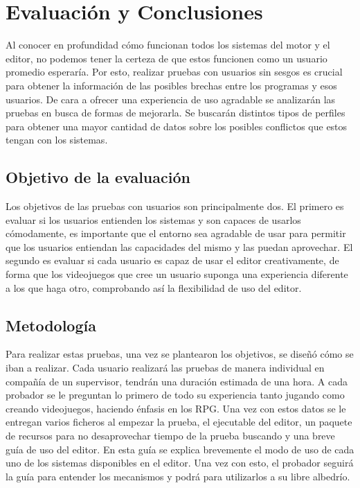 \chapter{Evaluación y Conclusiones}
\label{cap:conclusiones}

Al conocer en profundidad cómo funcionan todos los sistemas del motor y el editor, no podemos tener la certeza de que estos funcionen como un usuario promedio esperaría. Por esto, realizar pruebas con usuarios sin sesgos es crucial para obtener la información de las posibles brechas entre los programas y esos usuarios. De cara a ofrecer una experiencia de uso agradable se analizarán las pruebas en busca de formas de mejorarla. Se buscarán distintos tipos de perfiles para obtener una mayor cantidad de datos sobre los posibles conflictos que estos tengan con los sistemas.

\section{Objetivo de la evaluación}
Los objetivos de las pruebas con usuarios son principalmente dos. El primero es evaluar si los usuarios entienden los sistemas y son capaces de usarlos cómodamente, es importante que el entorno sea agradable de usar para permitir que los usuarios entiendan las capacidades del mismo y las puedan aprovechar. El segundo es evaluar si cada usuario es capaz de usar el editor creativamente, de forma que los videojuegos que cree un usuario suponga una experiencia diferente a los que haga otro, comprobando así la flexibilidad de uso del editor.

\section{Metodología}
Para realizar estas pruebas, una vez se plantearon los objetivos, se diseñó cómo se iban a realizar. Cada usuario realizará las pruebas de manera individual en compañía de un supervisor, tendrán una duración estimada de una hora. A cada probador se le preguntan lo primero de todo su experiencia tanto jugando como creando videojuegos, haciendo énfasis en los RPG. Una vez con estos datos se le entregan varios ficheros al empezar la prueba, el ejecutable del editor, un paquete de recursos para no desaprovechar tiempo de la prueba buscando y una breve guía de uso del editor. En esta guía se explica brevemente el modo de uso de cada uno de los sistemas disponibles en el editor. Una vez con esto, el probador seguirá la guía para entender los mecanismos y podrá para utilizarlos a su libre albedrío.

